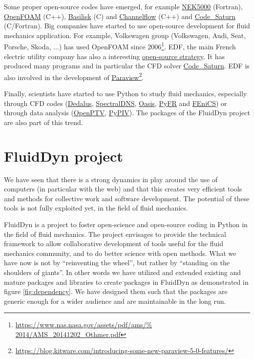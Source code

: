 Some proper open-source codes have emerged, for example
\href{https://nek5000.mcs.anl.gov/}{NEK5000} (Fortran),
\href{https://www.openfoam.com/}{OpenFOAM} (C++),
\href{http://basilisk.fr}{Basilisk} (C) and
\href{http://channelflow.org/}{Channelflow} (C++) and
\href{https://www.code-saturne.org}{Code\_Saturn} (C/Fortran).
%
Big companies have started to use open-source development for fluid mechanics
application. For example, Volkswagen group (Volkswagen, Audi, Seat, Porsche,
Skoda, ...) has used OpenFOAM since
2006\footnote{\url{https://www.nas.nasa.gov/assets/pdf/ams/%
2014/AMS_20141202_Othmer.pdf}}.
%
EDF, the main French electric utility company has also a interesting
\href{http://linuxfr.org/news/strat\%C3\%A9gie-open-source-\%C3\%A0-edf-rd}{%
open-source strategy}.  It has produced many programs and in particular the CFD
solver \href{https://www.code-saturne.org}{Code\_Saturn}.
%
EDF is also involved in the development of
\href{https://www.paraview.org/}{Paraview}\footnote{\url{https://blog.kitware.com/introducing-some-new-paraview-5-0-features/}}.

Finally, scientists have started to use Python to study fluid mechanics,
especially through CFD codes (\href{http://dedalus-project.org/}{Dedalus},
\href{https://github.com/spectralDNS}{SpectralDNS},
\href{https://github.com/mikaem/Oasis}{Oasis}, \href{http://pyfr.org/}{PyFR}
and \href{https://fenicsproject.org/}{FEniCS}) or through data analysis
(\href{http://www.openptv.net/}{OpenPTV},
\href{https://github.com/jr7/pypiv}{PyPIV}).
%
The packages of the FluidDyn project are also part of this trend.

\section{FluidDyn project}

We have seen that there is a strong dynamics in play around the use of
computers (in particular with the web) and that this creates very efficient
tools and methods for collective work and software development.
%
The potential of these tools is not fully exploited yet, in the field of fluid
mechanics.

FluidDyn is a project to foster open-science and open-source coding in Python
in the field of fluid mechanics.
%
The project envisages to provide the technical framework to allow collaborative
development of tools useful for the fluid mechanics community, and to do better
science with open methods.
%
What we have now is not by ``reinventing the wheel'', but rather by ``standing
on the shoulders of giants''. In other words we have utilized and extended
existing and mature packages and libraries to create packages in FluidDyn as
demonstrated in figure \ref{fig:dependency}. We have designed them such that
the packages are generic enough for a wider audience and are maintainable in
the long run.

